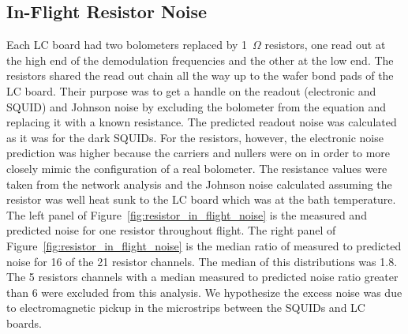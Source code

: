 
\subsection{In-Flight Resistor Noise}
\label{sec:flight_resistor_noise}

Each \ac{LC} board had two bolometers replaced by 1~$\Omega$ resistors, one read out at the high end of the demodulation frequencies and the other at the low end. 
The resistors shared the read out chain all the way up to the wafer bond pads of the LC board. 
Their purpose was to get a handle on the readout (electronic and \ac{SQUID}) and Johnson noise by excluding the bolometer from the equation and replacing it with a known resistance. 
The predicted readout noise was calculated as it was for the dark \ac{SQUID}s. 
For the resistors, however, the electronic noise prediction was higher because the carriers and nullers were on in order to more closely mimic the configuration of a real bolometer. 
The resistance values were taken from the network analysis and the Johnson noise calculated assuming the resistor was well heat sunk to the \ac{LC} board which was at the bath temperature. 
The left panel of Figure~\ref{fig:resistor_in_flight_noise} is the measured and predicted noise for one resistor throughout flight. 
The right panel of Figure~\ref{fig:resistor_in_flight_noise} is the median ratio of measured to predicted noise for 16 of the 21 resistor channels.
The median of this distributions was 1.8.  
The 5 resistors channels with a median measured to predicted noise ratio greater than 6 were excluded from this analysis. 
We hypothesize the excess noise was due to electromagnetic pickup in the microstrips between the \ac{SQUID}s and \ac{LC} boards.

